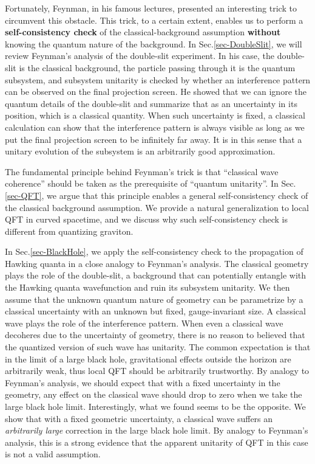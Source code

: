 \documentclass[aps,showpacs,twocolumn,floats,prd,superscriptaddress,nofootinbib]{revtex4-1}
\begin{document}
Fortunately, Feynman, in his famous lectures, presented an interesting trick to circumvent this obstacle. 
This trick, to a certain extent, enables us to perform a {\bf self-consistency check} of the classical-background assumption {\bf without} knowing the quantum nature of the background.
In Sec.\ref{sec-DoubleSlit}, we will review Feynman's analysis of the double-slit experiment. 
In his case, the double-slit is the classical background, the particle passing through it is the quantum subsystem, and subsystem unitarity is checked by whether an interference pattern can be observed on the final projection screen. 
He showed that we can ignore the quantum details of the double-slit and summarize that as an uncertainty in its position, which is a classical quantity. 
When such uncertainty is fixed, a classical calculation can show that the interference pattern is always visible as long as we put the final projection screen to be infinitely far away. 
It is in this sense that a unitary evolution of the subsystem is an arbitrarily good approximation.

The fundamental principle behind Feynman's trick is that ``classical wave coherence'' should be taken as the prerequisite of ``quantum unitarity''. 
In Sec.\ref{sec-QFT}, we argue that this principle enables a general self-consistency check of the classical background assumption. 
We provide a natural generalization to local QFT in curved spacetime, and we discuss why such self-consistency check is different from quantizing graviton.

In Sec.\ref{sec-BlackHole}, we apply the self-consistency check to the propagation of Hawking quanta in a close analogy to Feynman's analysis. 
The classical geometry plays the role of the double-slit, a background that can potentially entangle with the Hawking quanta wavefunction and ruin its subsystem unitarity. 
We then assume that the unknown quantum nature of geometry can be parametrize by a classical uncertainty with an unknown but fixed, gauge-invariant size. 
A classical wave plays the role of the interference pattern. 
When even a classical wave decoheres due to the uncertainty of geometry, there is no reason to believed that the quantized version of such wave has unitarity.
The common expectation is that in the limit of a large black hole, gravitational effects outside the horizon are arbitrarily weak, thus local QFT should be arbitrarily trustworthy.
By analogy to Feynman's analysis, we should expect that with a fixed uncertainty in the geometry, any effect on the classical wave should drop to zero when we take the large black hole limit.
Interestingly, what we found seems to be the opposite. 
We show that with a fixed geometric uncertainty, a classical wave suffers an {\it arbitrarily large} correction in the large black hole limit.
By analogy to Feynman's analysis, this is a strong evidence that the apparent unitarity of QFT in this case is not a valid assumption.
\end{document}
